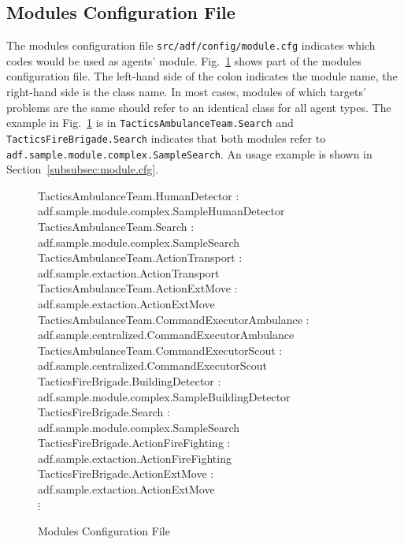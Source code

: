 \documentclass{article}
\begin{document}
\subsection{Modules Configuration File}
The modules configuration file \texttt{src/adf/config/module.cfg} indicates which codes would be used as agents' module. Fig.~\ref{fig:module.cfg} shows part of the modules configuration file. The left-hand side of the colon indicates the module name, the right-hand side is the class name. In most cases, modules of which targets' problems are the same should refer to an identical class for all agent types. The example in Fig.~\ref{fig:module.cfg} is in \texttt{TacticsAmbulanceTeam.Search} and \texttt{TacticsFireBrigade.Search} indicates that both modules refer to \\
\texttt{adf.sample.module.complex.SampleSearch}. An usage example is shown in Section~\ref{subsubsec:module.cfg}.


\begin{figure}[ht]
 \begin{center}
  \begin{screen}
   {\ttfamily\small
TacticsAmbulanceTeam.HumanDetector : adf.sample.module.complex.SampleHumanDetector\\
TacticsAmbulanceTeam.Search : adf.sample.module.complex.SampleSearch\\

TacticsAmbulanceTeam.ActionTransport : adf.sample.extaction.ActionTransport\\
TacticsAmbulanceTeam.ActionExtMove : adf.sample.extaction.ActionExtMove\\

TacticsAmbulanceTeam.CommandExecutorAmbulance : adf.sample.centralized.CommandExecutorAmbulance\\
TacticsAmbulanceTeam.CommandExecutorScout : adf.sample.centralized.CommandExecutorScout\\

TacticsFireBrigade.BuildingDetector : adf.sample.module.complex.SampleBuildingDetector\\
TacticsFireBrigade.Search : adf.sample.module.complex.SampleSearch\\

TacticsFireBrigade.ActionFireFighting : adf.sample.extaction.ActionFireFighting\\
TacticsFireBrigade.ActionExtMove : adf.sample.extaction.ActionExtMove\\
$\vdots$
}
  \end{screen}
  \caption{Modules Configuration File}
  \label{fig:module.cfg}
 \end{center}
\end{figure}
\end{document}
